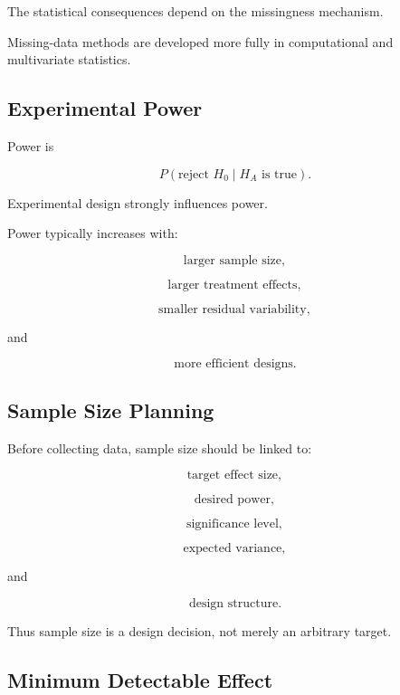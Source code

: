 The statistical consequences depend on the missingness mechanism.

Missing-data methods are developed more fully in computational and
multivariate statistics.

\subsection{Experimental Power}
\label{subsec:experimental-power}

Power is

\[
\boxed{
P(\text{reject }H_0\mid H_A\text{ is true}).
}
\]

Experimental design strongly influences power.

Power typically increases with:

\[
\boxed{
\text{larger sample size},
}
\]

\[
\boxed{
\text{larger treatment effects},
}
\]

\[
\boxed{
\text{smaller residual variability},
}
\]

and

\[
\boxed{
\text{more efficient designs}.
}
\]

\subsection{Sample Size Planning}
\label{subsec:sample-size-planning-design}

Before collecting data, sample size should be linked to:

\[
\boxed{
\text{target effect size},
}
\]

\[
\boxed{
\text{desired power},
}
\]

\[
\boxed{
\text{significance level},
}
\]

\[
\boxed{
\text{expected variance},
}
\]

and

\[
\boxed{
\text{design structure}.
}
\]

Thus sample size is a design decision, not merely an arbitrary target.

\subsection{Minimum Detectable Effect}
\label{subsec:minimum-detectable-effect}


